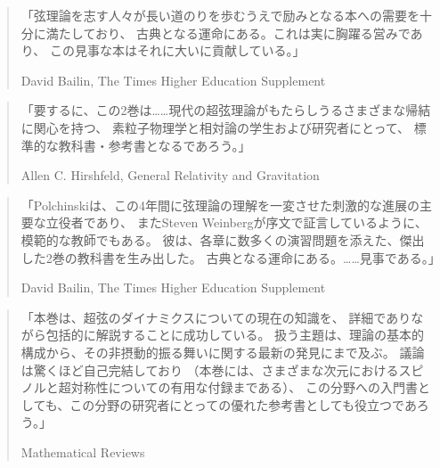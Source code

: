 \begin{quote}
「弦理論を志す人々が長い道のりを歩むうえで励みとなる本への需要を十分に満たしており、
古典となる運命にある。これは実に胸躍る営みであり、
この見事な本はそれに大いに貢献している。」
\begin{flushright}David Bailin, The Times Higher Education Supplement\end{flushright}
\end{quote}

\begin{quote}
「要するに、この2巻は……現代の超弦理論がもたらしうるさまざまな帰結に関心を持つ、
素粒子物理学と相対論の学生および研究者にとって、
標準的な教科書・参考書となるであろう。」
\begin{flushright}Allen C. Hirshfeld, General Relativity and Gravitation\end{flushright}
\end{quote}

\begin{quote}
「Polchinskiは、この4年間に弦理論の理解を一変させた刺激的な進展の主要な立役者であり、
またSteven Weinbergが序文で証言しているように、模範的な教師でもある。
彼は、各章に数多くの演習問題を添えた、傑出した2巻の教科書を生み出した。
古典となる運命にある。……見事である。」
\begin{flushright}David Bailin, The Times Higher Education Supplement\end{flushright}
\end{quote}

\begin{quote}
「本巻は、超弦のダイナミクスについての現在の知識を、
詳細でありながら包括的に解説することに成功している。
扱う主題は、理論の基本的構成から、その非摂動的振る舞いに関する最新の発見にまで及ぶ。
議論は驚くほど自己完結しており
（本巻には、さまざまな次元におけるスピノルと超対称性についての有用な付録まである）、
この分野への入門書としても、この分野の研究者にとっての優れた参考書としても役立つであろう。」
\begin{flushright}Mathematical Reviews\end{flushright}
\end{quote}

